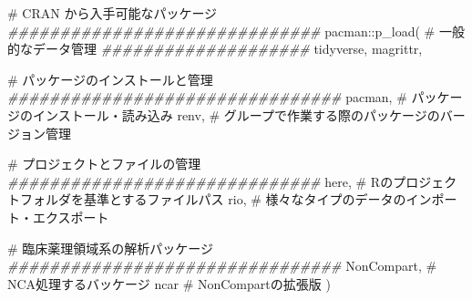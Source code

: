 \documentclass[
  letterpaper,
  DIV=11,
  numbers=noendperiod]{scrreprt}
\newenvironment{Shaded}{\begin{snugshade}}{\end{snugshade}}
\newcommand{\CommentTok}[1]{\textcolor[rgb]{0.37,0.37,0.37}{#1}}
\newcommand{\DocumentationTok}[1]{\textcolor[rgb]{0.37,0.37,0.37}{\textit{#1}}}
\newcommand{\FunctionTok}[1]{\textcolor[rgb]{0.28,0.35,0.67}{#1}}
\newcommand{\NormalTok}[1]{\textcolor[rgb]{0.00,0.23,0.31}{#1}}
\newcommand{\SpecialCharTok}[1]{\textcolor[rgb]{0.37,0.37,0.37}{#1}}
\begin{document}
\begin{Shaded}
\begin{Highlighting}[]
\CommentTok{\# CRAN から入手可能なパッケージ}
\DocumentationTok{\#\#\#\#\#\#\#\#\#\#\#\#\#\#\#\#\#\#\#\#\#\#\#\#\#\#\#\#\#\#}
\NormalTok{pacman}\SpecialCharTok{::}\FunctionTok{p\_load}\NormalTok{(}
  \CommentTok{\# 一般的なデータ管理}
  \DocumentationTok{\#\#\#\#\#\#\#\#\#\#\#\#\#\#\#\#\#\#\#\#}
\NormalTok{  tidyverse, }
\NormalTok{  magrittr, }
  
  \CommentTok{\# パッケージのインストールと管理}
  \DocumentationTok{\#\#\#\#\#\#\#\#\#\#\#\#\#\#\#\#\#\#\#\#\#\#\#\#\#\#\#\#\#\#\#\#}
\NormalTok{  pacman,   }\CommentTok{\# パッケージのインストール・読み込み}
\NormalTok{  renv,     }\CommentTok{\# グループで作業する際のパッケージのバージョン管理  }
  
  \CommentTok{\# プロジェクトとファイルの管理}
  \DocumentationTok{\#\#\#\#\#\#\#\#\#\#\#\#\#\#\#\#\#\#\#\#\#\#\#\#\#\#\#\#\#\#}
\NormalTok{  here,     }\CommentTok{\# Rのプロジェクトフォルダを基準とするファイルパス}
\NormalTok{  rio,      }\CommentTok{\# 様々なタイプのデータのインポート・エクスポート}
  
  \CommentTok{\# 臨床薬理領域系の解析パッケージ}
  \DocumentationTok{\#\#\#\#\#\#\#\#\#\#\#\#\#\#\#\#\#\#\#\#\#\#\#\#\#\#\#\#\#\#\#\#}
\NormalTok{  NonCompart, }\CommentTok{\# NCA処理するバッケージ}
\NormalTok{  ncar        }\CommentTok{\# NonCompartの拡張版}
\NormalTok{)}
\end{Highlighting}
\end{Shaded}
\end{document}
